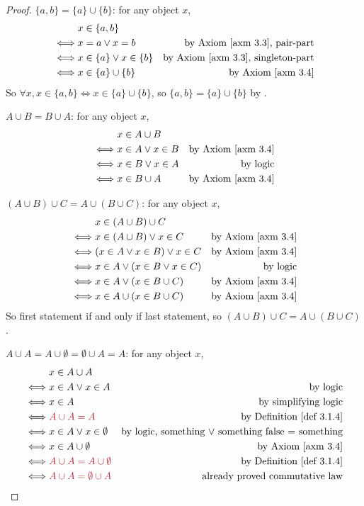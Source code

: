 \begin{proof}
\( \{a, b\} = \{ a \} \cup \{ b \} \): for any object \(x\),
\begin{align*}
         & x \in \{a, b\} \\
    \iff & x = a \lor x = b & \text{by \AXM{3.3}, pair-part} \\
    \iff & x \in \{a\} \lor x \in \{b\} & \text{by \AXM{3.3}, singleton-part} \\
    \iff & x \in \{a\} \cup \{b\} & \text{by \AXM{3.4}} \\
\end{align*}
So \(\forall x, x \in \{a, b\} \iff x \in \{a\} \cup \{b\} \), so \(\{a, b\} = \{a\} \cup \{b\} \) by .

\(A \cup B = B \cup A\): for any object \(x\),
\begin{align*}
         & x \in A \cup B \\
    \iff & x \in A \lor x \in B & \text{by \AXM{3.4}} \\
    \iff & x \in B \lor x \in A & \text{by logic} \\
    \iff & x \in B \cup A & \text{by \AXM{3.4}}
\end{align*}

\((A \cup B) \cup C = A \cup (B \cup C)\): for any object \(x\),
\begin{align*}
         & x \in (A \cup B) \cup C \\
         \iff & x \in (A \cup B) \lor x \in C & \text{by \AXM{3.4}} \\
         \iff & (x \in A \lor x \in B) \lor x \in C & \text{by \AXM{3.4}} \\
         \iff & x \in A \lor (x \in B \lor x \in C) & \text{by logic} \\
         \iff & x \in A \lor (x \in B \cup C) & \text{by \AXM{3.4}} \\
         \iff & x \in A \cup (x \in B \cup C) & \text{by \AXM{3.4}} \\
\end{align*}
So first statement if and only if last statement, so \((A \cup B) \cup C = A \cup (B \cup C)\).

\(A \cup A = A \cup \emptyset = \emptyset \cup A = A\): for any object \(x\),
\begin{align*}
         & x \in A \cup A \\
    \iff & x \in A \lor x \in A & \text{by logic} \\
    \iff & x \in A & \text{by simplifying logic} \\
    \iff & \MAROON{A \cup A = A} & \text{by \DEF{3.1.4}} \\
    \iff & x \in A \lor x \in \emptyset & \text{by logic, something \(\lor\) something false = something} \\
    \iff & x \in A \cup \emptyset & \text{by \AXM{3.4}} \\
    \iff & \MAROON{A \cup A = A \cup \emptyset} & \text{by \DEF{3.1.4}} \\
    \iff & \MAROON{A \cup A = \emptyset \cup A} & \text{already proved commutative law}
\end{align*}
\end{proof}

